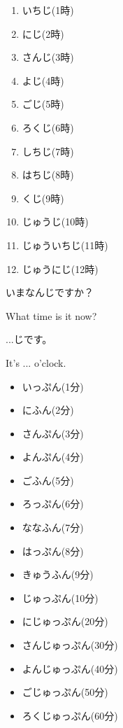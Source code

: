 \documentclass{article}
\begin{document}
\begin{enumerate}
    \item いちじ(1時)
    \item にじ(2時)
    \item さんじ(3時)
    \item よじ(4時)
    \item ごじ(5時)
    \item ろくじ(6時)
    \item しちじ(7時)
    \item はちじ(8時)
    \item くじ(9時)
    \item じゅうじ(10時)
    \item じゅういちじ(11時)
    \item じゅうにじ(12時)
\end{enumerate}
いまなんじですか？

What time is it now?

...じです。

It's ... o'clock.

\begin{itemize}
    \item いっぷん(1分)
    \item にふん(2分)
    \item さんぷん(3分)
    \item よんぷん(4分)
    \item ごふん(5分)
    \item ろっぷん(6分)
    \item ななふん(7分)
    \item はっぷん(8分)
    \item きゅうふん(9分)
    \item じゅっぷん(10分)
    \item にじゅっぷん(20分)
    \item さんじゅっぷん(30分)
    \item よんじゅっぷん(40分)
    \item ごじゅっぷん(50分)
    \item ろくじゅっぷん(60分)
\end{itemize}
\end{document}
